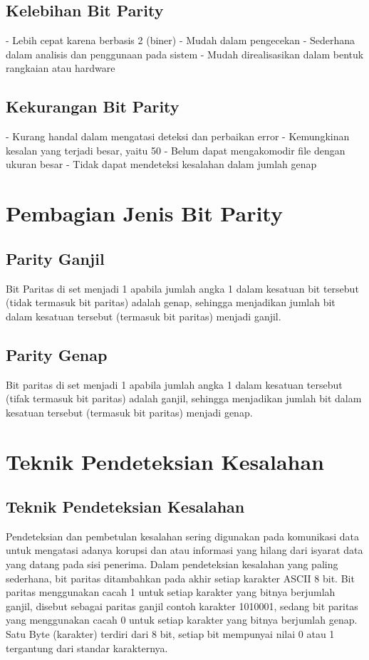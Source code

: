 \subsection{Kelebihan Bit Parity}
-   Lebih cepat karena berbasis 2 (biner)
-   Mudah dalam pengecekan
-   Sederhana dalam analisis dan penggunaan pada sistem
-   Mudah direalisasikan dalam bentuk rangkaian atau hardware

\subsection{Kekurangan Bit Parity}
-   Kurang handal dalam mengatasi deteksi dan perbaikan error
-   Kemungkinan kesalan yang terjadi besar, yaitu 50%
-   Belum dapat mengakomodir file dengan ukuran besar
-   Tidak dapat mendeteksi kesalahan dalam jumlah genap



\section{Pembagian Jenis Bit Parity}
\subsection{Parity Ganjil}
Bit Paritas di set menjadi 1 apabila jumlah angka 1 dalam kesatuan bit tersebut (tidak termasuk bit paritas) adalah genap, sehingga menjadikan jumlah bit dalam kesatuan tersebut (termasuk bit paritas) menjadi ganjil.
 
\subsection{Parity Genap}
Bit paritas di set menjadi 1 apabila jumlah angka 1 dalam kesatuan tersebut (tifak termasuk bit paritas) adalah ganjil, sehingga menjadikan jumlah bit dalam kesatuan tersebut (termasuk bit paritas) menjadi genap.


\section{Teknik Pendeteksian Kesalahan}
\subsection{Teknik Pendeteksian Kesalahan}
Pendeteksian dan pembetulan kesalahan sering digunakan pada komunikasi data untuk mengatasi adanya korupsi dan atau informasi yang hilang dari isyarat data yang datang pada sisi penerima. Dalam pendeteksian kesalahan yang paling sederhana, bit paritas ditambahkan pada akhir setiap karakter ASCII 8 bit. Bit paritas menggunakan cacah 1 untuk setiap karakter yang bitnya berjumlah ganjil, disebut sebagai paritas ganjil contoh karakter 1010001, sedang bit paritas yang menggunakan cacah 0 untuk setiap karakter yang bitnya berjumlah genap. Satu Byte (karakter) terdiri dari 8 bit, setiap bit mempunyai nilai 0 atau 1 tergantung dari standar karakternya.


